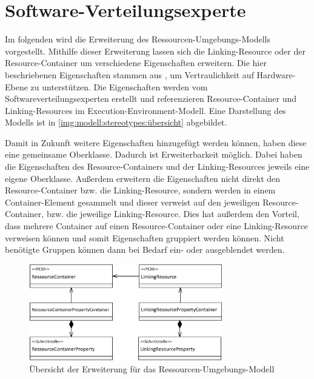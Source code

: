 \section{Software-Verteilungsexperte}
\label{sec:stereotypes}
Im folgenden wird die Erweiterung des Ressourcen-Umgebungs-Modells vorgestellt. Mithilfe dieser Erweiterung lassen sich die Linking-Resource oder der Resource-Container um verschiedene Eigenschaften erweitern. Die hier beschriebenen Eigenschaften stammen aus \cite{Kramera}, um Vertraulichkeit auf Hardware-Ebene zu unterstützen. Die Eigenschaften werden vom Softwareverteilungsexperten erstellt und referenzieren Resource-Container und Linking-Resources im Execution-Environment-Modell. Eine Darstellung des Modells ist in \autoref{img:modell:stereotypes:übersicht} abgebildet. \par
Damit in Zukunft weitere Eigenschaften hinzugefügt werden können, haben diese eine gemeinsame Oberklasse. Dadurch ist Erweiterbarkeit möglich. Dabei haben die Eigenschaften des Resource-Containers und der Linking-Resources jeweils eine eigene Oberklasse. Außerdem erweitern die Eigenschaften nicht direkt den Resource-Container bzw. die Linking-Resource, sondern werden in einem Container-Element gesammelt und dieser verweist auf den jeweiligen Resource-Container, bzw. die jeweilige Linking-Resource. Dies hat außerdem den Vorteil, dass mehrere Container auf einen Resource-Container oder eine Linking-Resource verweisen können und somit Eigenschaften gruppiert werden können. Nicht benötigte Gruppen können dann bei Bedarf ein- oder ausgeblendet werden. \par
\begin{figure}[h]
	\centering
  	\includegraphics[width=0.75\textwidth]{images/meta_stereotypes_ubersicht.png}
	\caption{Übersicht der Erweiterung für das Ressourcen-Umgebungs-Modell}
	\label{img:modell:stereotypes:übersicht}
\end{figure}
